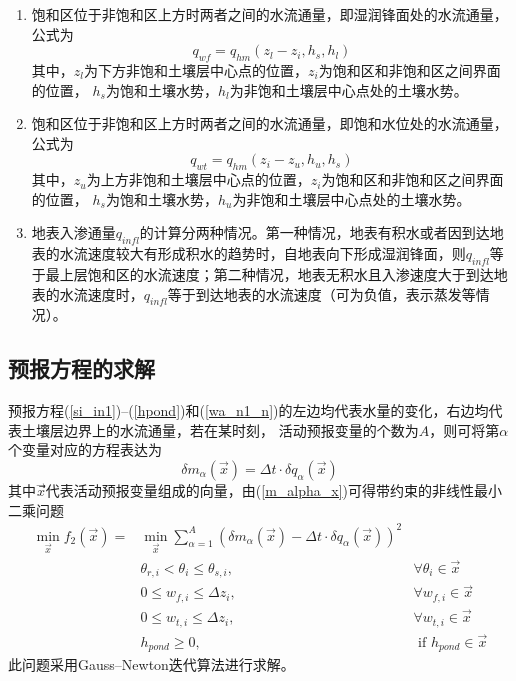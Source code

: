 \begin{enumerate}
    \item 饱和区位于非饱和区上方时两者之间的水流通量，即湿润锋面处的水流通量，公式为
    \begin{equation}
    q_{wf}=q_{h m}\left(z_{l}-z_{i}, h_{s}, h_{l}\right)
    \end{equation}
    其中，$z_l$为下方非饱和土壤层中心点的位置，$z_i$为饱和区和非饱和区之间界面的位置，
    $h_s$为饱和土壤水势，$h_l$为非饱和土壤层中心点处的土壤水势。

    \item 饱和区位于非饱和区上方时两者之间的水流通量，即饱和水位处的水流通量，公式为
    \begin{equation}
    q_{wt}=q_{h m}\left(z_{i}-z_{u}, h_{u}, h_{s}\right)
    \end{equation}
    其中，$z_u$为上方非饱和土壤层中心点的位置，$z_i$为饱和区和非饱和区之间界面的位置，
    $h_s$为饱和土壤水势，$h_u$为非饱和土壤层中心点处的土壤水势。

    \item 地表入渗通量$q_{infl}$的计算分两种情况。第一种情况，地表有积水或者因到达地表的水流速度较大有形成积水的趋势时，自地表向下形成湿润锋面，则$q_{infl}$等于最上层饱和区的水流速度；第二种情况，地表无积水且入渗速度大于到达地表的水流速度时，$q_{infl}$等于到达地表的水流速度（可为负值，表示蒸发等情况）。
    
\end{enumerate}


\subsection{预报方程的求解}
预报方程(\ref{si_in1})--(\ref{hpond})和(\ref{wa_n1_n})的左边均代表水量的变化，右边均代表土壤层边界上的水流通量，若在某时刻，
活动预报变量的个数为$A$，则可将第$\alpha$个变量对应的方程表达为
\begin{equation}\label{m_alpha_x}
\delta m_{\alpha}(\vec{x})=\Delta t \cdot \delta q_{\alpha}(\vec{x})
\end{equation}
其中$\vec{x}$⃗代表活动预报变量组成的向量，由(\ref{m_alpha_x})可得带约束的非线性最小二乘问题
\begin{equation}
\begin{aligned}
\min _{\vec{x}} f_{2}(\vec{x})=& \min _{\vec{x}} \sum_{\alpha=1}^{A}\left(\delta m_{\alpha}(\vec{x})-\Delta t \cdot \delta q_{\alpha}(\vec{x})\right)^{2} \\ 
& \theta_{r, i}<\theta_{i} \leq \theta_{s, i}, & \forall \theta_{i} \in \vec{x} \\ 
& 0 \leq w_{f, i} \leq \Delta z_{i},               & \forall w_{f, i} \in \vec{x} \\ 
& 0 \leq w_{t, i} \leq \Delta z_{i},               & \forall w_{t, i} \in \vec{x} \\ 
& h_{ {pond }} \geq 0,                               & \text{ if } h_{ {pond }} \in \vec{x} 
\end{aligned}
\end{equation}
此问题采用Gauss--Newton迭代算法进行求解。

